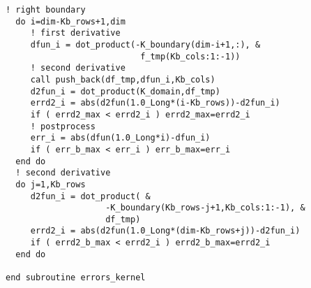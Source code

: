 \documentclass[9pt,technote,twoside,letterpaper,onecolumn]{IEEEtran}
\begin{document}
\begin{multicols}{2}
\begin{lstlisting}[caption={Algoritmo del cálculo de las derivadas},label={lst:opt_alg}]
  ! right boundary
  do i=dim-Kb_rows+1,dim
     ! first derivative
     dfun_i = dot_product(-K_boundary(dim-i+1,:), &
                           f_tmp(Kb_cols:1:-1))
     ! second derivative
     call push_back(df_tmp,dfun_i,Kb_cols)
     d2fun_i = dot_product(K_domain,df_tmp)
     errd2_i = abs(d2fun(1.0_Long*(i-Kb_rows))-d2fun_i)
     if ( errd2_max < errd2_i ) errd2_max=errd2_i
     ! postprocess
     err_i = abs(dfun(1.0_Long*i)-dfun_i)
     if ( err_b_max < err_i ) err_b_max=err_i
  end do
  ! second derivative
  do j=1,Kb_rows
     d2fun_i = dot_product( & 
                    -K_boundary(Kb_rows-j+1,Kb_cols:1:-1), &
                    df_tmp)
     errd2_i = abs(d2fun(1.0_Long*(dim-Kb_rows+j))-d2fun_i)
     if ( errd2_b_max < errd2_i ) errd2_b_max=errd2_i
  end do
    
end subroutine errors_kernel
\end{lstlisting}
\end{multicols}
\end{document}
